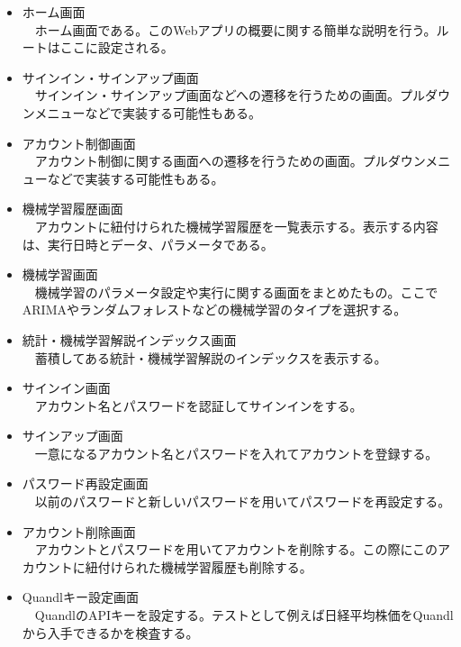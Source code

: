\documentclass{scrartcl}
\begin{document}
\begin{itemize}
\item ホーム画面\\
　ホーム画面である。このWebアプリの概要に関する簡単な説明を行う。ルートはここに設定される。\\
\item サインイン・サインアップ画面\\
　サインイン・サインアップ画面などへの遷移を行うための画面。プルダウンメニューなどで実装する可能性もある。\\
\item アカウント制御画面\\
　アカウント制御に関する画面への遷移を行うための画面。プルダウンメニューなどで実装する可能性もある。\\
\item 機械学習履歴画面\\
　アカウントに紐付けられた機械学習履歴を一覧表示する。表示する内容は、実行日時とデータ、パラメータである。\\
\item 機械学習画面\\
　機械学習のパラメータ設定や実行に関する画面をまとめたもの。ここでARIMAやランダムフォレストなどの機械学習のタイプを選択する。\\
\item 統計・機械学習解説インデックス画面\\
　蓄積してある統計・機械学習解説のインデックスを表示する。\\
\item サインイン画面\\
　アカウント名とパスワードを認証してサインインをする。\\
\item サインアップ画面\\
　一意になるアカウント名とパスワードを入れてアカウントを登録する。\\
\item パスワード再設定画面\\
　以前のパスワードと新しいパスワードを用いてパスワードを再設定する。\\
\item アカウント削除画面\\
　アカウントとパスワードを用いてアカウントを削除する。この際にこのアカウントに紐付けられた機械学習履歴も削除する。\\
\item Quandlキー設定画面\\
　QuandlのAPIキーを設定する。テストとして例えば日経平均株価をQuandlから入手できるかを検査する。\\

\end{itemize}
\end{document}
